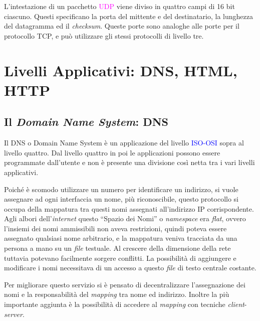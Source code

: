 \documentclass{article}
\numberwithin{equation}{subsection}
\begin{document}
L'intestazione di un pacchetto \textcolor{Fuchsia}{UDP} viene diviso in quattro campi di 16 bit ciascuno. Questi specificano la porta del mittente e del destinatario, la lunghezza del datagramma ed il \textit{checksum}. Queste porte sono analoghe alle porte per il protocollo \textcolor{Bittersweet}{TCP}, e può utilizzare gli stessi protocolli di livello tre. 


\clearpage

\section{Livelli Applicativi: \textcolor{Mahogany}{DNS}, \textcolor{Peach}{HTML}, \textcolor{NavyBlue}{HTTP}}

\subsection{Il \textit{Domain Name System}: \textcolor{Mahogany}{DNS}}

Il \textcolor{Mahogany}{DNS} o Domain Name System è un applicazione del livello \textcolor{blue}{ISO-OSI} sopra al livello quattro. Dal livello quattro in poi le applicazioni possono essere programmate dall'utente e non è presente una divisione così netta tra i vari livelli applicativi. 

Poiché è scomodo utilizzare un numero per identificare un indirizzo, si vuole assegnare ad ogni interfaccia un nome, più riconoscibile, questo protocollo si occupa della mappatura 
tra questi nomi assegnati all'indirizzo \textcolor{Bittersweet}{IP} corrispondente. 
Agli albori dell'\textit{internet} questo ``Spazio dei Nomi'' o \textit{namespace} era \textit{flat}, ovvero l'insiemi dei nomi ammissibili non aveva restrizioni, quindi poteva essere assegnato qualsiasi nome arbitrario, e la mappatura veniva tracciata da una 
persona a mano su un \textit{file} testuale. Al crescere della dimensione della rete tuttavia potevano facilmente sorgere conflitti. La possibilità di aggiungere e modificare i nomi 
necessitava di un accesso a questo \textit{file} di testo centrale costante. 

Per migliorare questo servizio si è pensato di decentralizzare l'assegnazione dei nomi e la responsabilità del \textit{mapping} tra nome ed indirizzo. Inoltre la più 
importante aggiunta è la possibilità di accedere al \textit{mapping} con tecniche \textit{client}-\textit{server}. 
\end{document}
